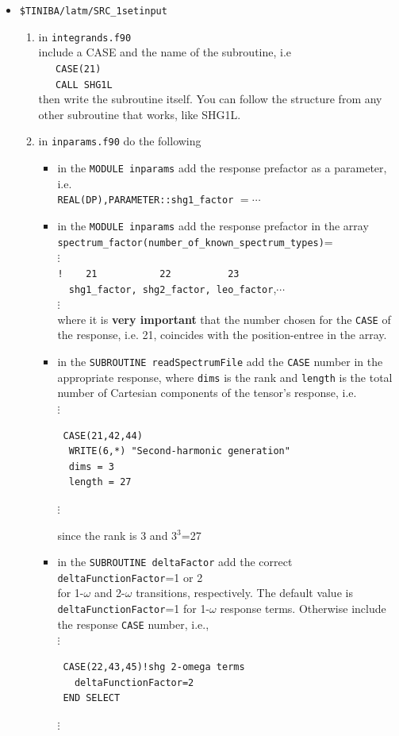 \documentclass[openany,oneside]{book}
\numberwithin{equation}{section}
\begin{document}
\begin{itemize}
\item\verb=$TINIBA/latm/SRC_1setinput=

\begin{enumerate}
\item in
  \verb=integrands.f90=\\
 include a CASE and the name of the subroutine, i.e \\
\verb=   CASE(21)=\\
\verb=   CALL SHG1L=\\
then write the subroutine itself. You can follow the structure from
  any other subroutine that works, like SHG1L. 

\item in \verb=inparams.f90= do the following
\begin{itemize}
\item in the \verb=MODULE inparams= 
add the response prefactor as a parameter, i.e.\\
\verb=REAL(DP),PARAMETER::shg1_factor= $=\cdots$
\item in the \verb=MODULE inparams=  add the response prefactor in the array\\
\verb=spectrum_factor(number_of_known_spectrum_types)==\\       
$\vdots$\\
\verb=!    21           22          23           =\\
\verb=  shg1_factor, shg2_factor, leo_factor=,$\cdots$\\
$\vdots$\\
where it is {\bf very important} that the number chosen for the
\verb=CASE= of the response, i.e. 21, coincides with the position-entree in
the array.
\item in the \verb=SUBROUTINE readSpectrumFile= add the \verb=CASE=
 number in the appropriate response, where \verb=dims= is the rank
 and \verb=length= is the total number of
 Cartesian components of
the tensor's response, i.e.\\
$\vdots$
\begin{verbatim}
 CASE(21,42,44)
  WRITE(6,*) "Second-harmonic generation"
  dims = 3
  length = 27
\end{verbatim}
$\vdots$

since the rank is 3 and 3$^3$=27

\item in the \verb=SUBROUTINE deltaFactor= add the 
correct\\ \verb=deltaFunctionFactor==1 or 2\\ for 1-$\omega$ and 
2-$\omega$ transitions, respectively.
 The default value is\\
\verb=deltaFunctionFactor==1 for 1-$\omega$ response terms.
Otherwise include the response \verb=CASE= number, i.e.,\\
$\vdots$
\begin{verbatim}
 CASE(22,43,45)!shg 2-omega terms
   deltaFunctionFactor=2
 END SELECT
\end{verbatim}
$\vdots$


\end{itemize}
\end{enumerate}
\end{itemize}
\end{document}
